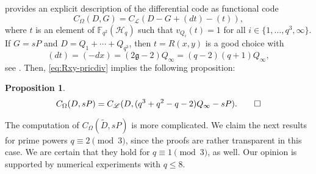 \documentclass[11pt]{amsart}
\theoremstyle{plain}
\newtheorem{proposition}[theorem]{Proposition}
\theoremstyle{definition}
\theoremstyle{remark}
\newcommand{\g}{\mathfrak{g}}
\begin{document}
\cite[Proposition 8.1.2]{stichtenoth2009algebraic} provides an explicit description of the differential code as functional code
\[C_\Omega(D,G) = C_\mathscr{L}(D-G+(dt)-(t)),\]
where $t$ is an element of $\mathbb{F}_{q^2}(\mathscr{H}_q)$ such that $v_{Q_i}(t)=1$ for all $i\in \{1,\ldots,q^3,\infty\}$. If $G=sP$ and $D=Q_1+\cdots+Q_{q^3}$, then $t=R(x,y)$ is a good choice with 
\[(dt)=(-dx)=(2\g-2)Q_{\infty}=(q-2)(q+1)Q_{\infty}, \]
see \cite[Lemma 6.4.4]{stichtenoth2009algebraic}. Then, \eqref{eq:Rxy-pricdiv} implies the following proposition:
\begin{proposition}
\[C_\Omega(D,sP) = C_\mathscr{L}(D,(q^3+q^2-q-2)Q_{\infty}-sP). \qed\]
\end{proposition}

The computation of $C_\Omega(\tilde{D},sP)$ is more complicated. We claim the next results for prime powers $q\equiv 2 \pmod3$, since the proofs are rather transparent in this case. We are certain that they hold for $q\equiv 1\pmod3$, as well. Our opinion is supported by numerical experiments with $q\leq 8$. 
\end{document}

